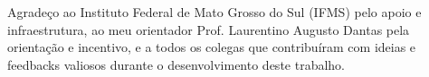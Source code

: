 \begin{agradecimentos}
	
	Agradeço ao Instituto Federal de Mato Grosso do Sul (IFMS) pelo apoio e infraestrutura, ao meu orientador Prof. Laurentino Augusto Dantas pela orientação e incentivo, e a todos os colegas que contribuíram com ideias e feedbacks valiosos durante o desenvolvimento deste trabalho.

\end{agradecimentos}